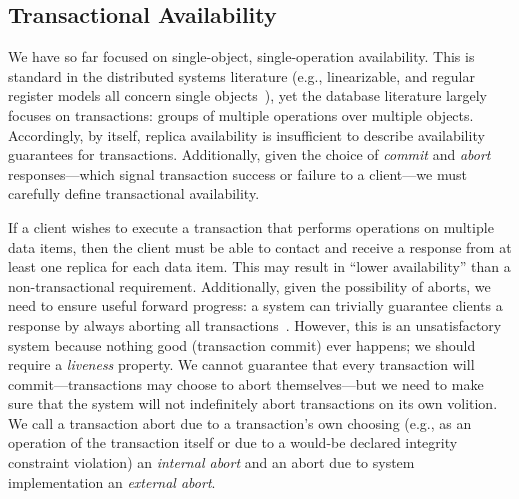 

\subsection{Transactional Availability}

We have so far focused on single-object, single-operation
availability. This is standard in the distributed systems literature
(e.g., linearizable, and regular register models all concern
single objects~\cite{herlihy-art}), yet the database literature
largely focuses on transactions: groups of multiple operations over
multiple objects. Accordingly, by itself, replica availability is
insufficient to describe availability guarantees for
transactions. Additionally, given the choice of \textit{commit} and
\textit{abort} responses---which signal transaction success or failure
to a client---we must carefully define transactional availability.

If a client wishes to execute a transaction that performs operations
on multiple data items, then the client must be able to contact and
receive a response from at least one replica for each data item. This
may result in ``lower availability'' than a non-transactional
requirement. Additionally, given the possibility of aborts, we need to
ensure useful forward progress: a system can trivially guarantee
clients a response by always aborting all
transactions~\cite{transaction-liveness}. However, this is an
unsatisfactory system because nothing good (transaction commit) ever
happens; we should require a \textit{liveness} property. We cannot
guarantee that every transaction will commit---transactions may choose
to abort themselves---but we need to make sure that the system will
not indefinitely abort transactions on its own volition. We call a
transaction abort due to a transaction's own choosing (e.g., as an
operation of the transaction itself or due to a would-be declared
integrity constraint violation) an \textit{internal abort} and an
abort due to system implementation an \textit{external abort}.


